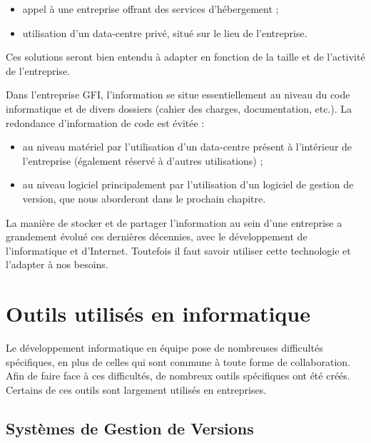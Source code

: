 \begin{itemize}
\item appel à une entreprise offrant des services d'hébergement ;
\item utilisation d'un data-centre privé, situé sur le lieu de l'entreprise.
\end{itemize}

Ces solutions seront bien entendu à adapter en fonction de la taille et de l'activité de l'entreprise.


\begin{app}
Dans l'entreprise GFI, l'information se situe essentiellement au niveau du code informatique et de divers dossiers (cahier des charges, documentation, etc.). La redondance d'information de code est évitée :
\begin{itemize}
\item au niveau matériel par l'utilisation d'un data-centre présent à l'intérieur de l'entreprise (également réservé à d'autres utilisations) ;
\item au niveau logiciel principalement par l'utilisation d'un logiciel de gestion de version, que nous aborderont dans le prochain chapitre.
\end{itemize}
\end{app}

La manière de stocker et de partager l'information au sein d'une entreprise a grandement évolué ces dernières décennies, avec le développement de l'informatique et d'Internet. Toutefois il faut savoir utiliser cette technologie et l'adapter à nos besoins.

\section{Outils utilisés en informatique}

Le développement informatique en équipe pose de nombreuses difficultés spécifiques, en plus de celles qui sont commune à toute forme de collaboration. Afin de faire face à ces difficultés, de nombreux outils spécifiques ont été créés. Certains de ces outils sont largement utilisés en entreprises.

\subsection{Systèmes de Gestion de Versions}

